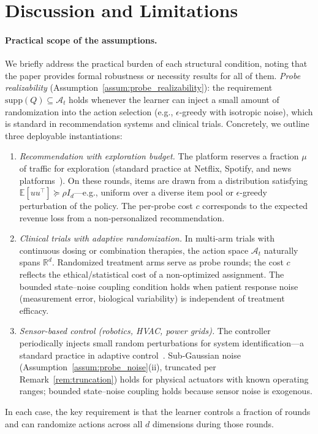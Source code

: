\documentclass{article}
\newcommand{\R}{\mathbb{R}}
\newcommand{\E}{\mathbb{E}}
\newcommand{\cA}{\mathcal{A}}
\newcommand{\supp}{\mathrm{supp}}
\begin{document}
\section{Discussion and Limitations}
\label{sec:discussion}

  
  \paragraph{Practical scope of the assumptions.}
  We briefly address the practical burden of each structural condition,
  noting that the paper provides formal robustness or necessity results
  for all of them.
  \emph{Probe realizability} (Assumption~\ref{assum:probe_realizability}):
  the requirement $\supp(Q) \subseteq \cA_t$ holds whenever the learner
  can inject a small amount of randomization into the action selection
  (e.g., $\epsilon$-greedy with isotropic noise), which is standard in
  recommendation systems and clinical trials.
 Concretely, we outline three deployable instantiations:
  \begin{enumerate}[nosep,leftmargin=2em]
  \item \emph{Recommendation with exploration budget.}
  The platform reserves a fraction $\mu$ of traffic for exploration (standard practice at Netflix, Spotify, and news
  platforms~\citep{li2010contextual}). On these rounds, items are drawn from a distribution satisfying $\E[uu^\top]\succeq \rho
  I_d$---e.g., uniform over a diverse item pool or $\epsilon$-greedy perturbation of the policy. The per-probe cost $c$ corresponds
  to the expected revenue loss from a non-personalized recommendation.
  \item \emph{Clinical trials with adaptive randomization.}
  In multi-arm trials with continuous dosing or combination therapies, the action space $\cA_t$ naturally spans $\R^d$. Randomized
  treatment arms serve as probe rounds; the cost $c$ reflects the ethical/statistical cost of a non-optimized assignment. The
  bounded state--noise coupling condition holds when patient response noise (measurement error, biological variability) is independent
  of treatment efficacy.
  \item \emph{Sensor-based control (robotics, HVAC, power grids).}
  The controller periodically injects small random perturbations for system identification---a standard practice in adaptive
  control~\citep{memmel2024asid}. Sub-Gaussian noise (Assumption~\ref{assum:probe_noise}(ii), truncated per Remark~\ref{rem:truncation}) holds for physical actuators with
  known operating ranges; bounded state--noise coupling holds because sensor noise is exogenous.
  \end{enumerate}
  In each case, the key requirement is that the learner controls a fraction of rounds and can randomize actions across all $d$
  dimensions during those rounds.
\end{document}
